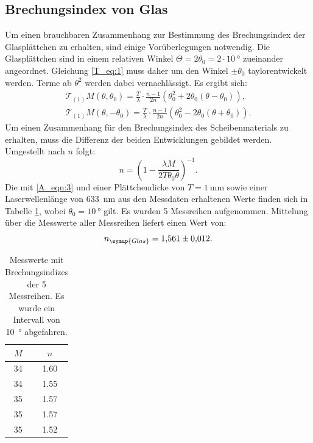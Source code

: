 \documentclass[
  bibliography=totoc,     %
  captions=tableheading,  %
  titlepage=firstiscover, %
]{scrartcl}
\begin{document}
\subsection{Brechungsindex von Glas}
Um einen brauchbaren Zusammenhang zur Bestimmung des Brechungsindex der Glasplättchen
zu erhalten, sind einige Vorüberlegungen notwendig. Die Glasplättchen sind in einem
relativen Winkel $\Theta = 2 \theta_0 = 2 \cdot \SI{10}{\degree}$ zueinander
angeordnet. Gleichung \eqref{T_eq:1} muss daher um
den Winkel $\pm \theta_0$ taylorentwickelt werden. Terme ab $\theta^2$
werden dabei vernachlässigt. Es ergibt sich:
\begin{gather*}
  \mathcal{T}_{(1)}M(\theta,\theta_0) = \frac{T}{\lambda}\cdot\frac{n-1}{2n}(\theta_0^2 + 2\theta_0(\theta-\theta_0)),\\
  \mathcal{T}_{(1)}M(\theta,-\theta_0) = \frac{T}{\lambda}\cdot\frac{n-1}{2n}(\theta_0^2 - 2\theta_0(\theta+\theta_0)).
\end{gather*}
Um einen Zusammenhang für den Brechungsindex des Scheibenmaterials zu erhalten, muss
die Differenz der beiden Entwicklungen gebildet werden. Umgestellt nach $n$ folgt:
\begin{equation}
  n = \left( 1 - \frac{\lambda{M}}{2T\theta_0\theta} \right)^{-1}.
\label{A_eqn:3}
\end{equation}
Die mit \eqref{A_eqn:3} und einer Plättchendicke von $T=\SI{1}{\milli\metre}$
sowie einer Laserwellenlänge von \SI{633}{\nano\metre}
aus den Messdaten erhaltenen Werte finden sich in Tabelle
\ref{A_tab:2}, wobei $\theta_0 = \SI{10}{\degree}$ gilt. Es wurden 5 Messreihen
aufgenommen. Mittelung über die Messwerte aller Messreihen liefert einen Wert von:
\begin{equation*}
  n_{\symup{Glas}} = \num{1.561(12)}.
\end{equation*}

\begin{table}[h!]
  \centering
  \caption{Messwerte mit Brechungsindizes der 5 Messreihen. Es wurde ein
  Intervall von \SI{10}{\degree} abgefahren.}
  \label{A_tab:2}
  \begin{tabular}{c | c}
    \toprule
    $M$ & $n$ \\
    \midrule
    34 & 1.60 \\
    34 & 1.55 \\
    35 & 1.57 \\
    35 & 1.57 \\
    35 & 1.52 \\
    \bottomrule
  \end{tabular}
\end{table}
\end{document}
